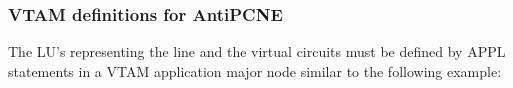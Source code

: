 \documentclass[letterpaper,10pt,english]{sphinxmanual}
\begin{document}


\subsubsection{VTAM definitions for AntiPCNE}
\label{\detokenize{connectivity_guide:vtam-definitions-for-antipcne}}
The LU’s representing the line and the virtual circuits must be defined by APPL statements in a VTAM application major node similar to the following example:

\begin{sphinxVerbatim}[commandchars=\\\{\}]
  
  
           

\end{sphinxVerbatim}
\end{document}

